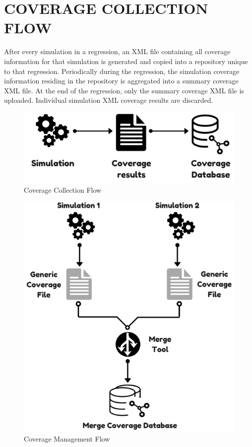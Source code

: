 \section{COVERAGE COLLECTION FLOW}
After every simulation in a regression, an XML file containing all coverage information for that simulation is generated and copied into a repository unique to that regression. Periodically during the regression, the simulation coverage information residing in the repository is aggregated into a summary coverage XML file. At the end of the regression, only the summary coverage XML file is uploaded. Individual simulation XML coverage results are discarded.
\vspace{15pt}
\begin{figure}[h!]
\centering
\includegraphics[scale=0.8]{./figures/coverage_collection.png}
\caption{Coverage Collection Flow}
\label{fig:coverage_collection.png}
\end{figure}

\vspace{15pt}
\begin{figure}[h!]
\centering
\includegraphics[scale=0.8]{./figures/coverage_management.png}
\caption{Coverage Management Flow}
\label{fig:coverage_management.png}
\end{figure}

